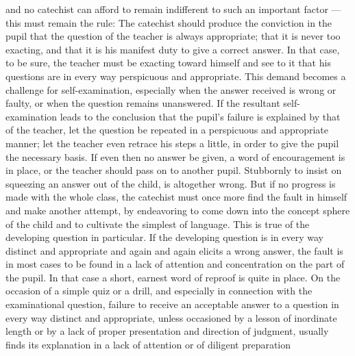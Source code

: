 and no catechist can afford to remain indifferent to such an important factor — this must remain the rule: The catechist should produce the conviction in the pupil that the question of the teacher is always appropriate; that it is never too exacting, and that it is his manifest duty to give a correct answer. In that case, to be sure, the teacher must be exacting toward himself and see to it that his questions are in every way perspicuous and appropriate. This demand becomes a challenge for self-examination, especially when the answer received is wrong or faulty, or when the question remains unanswered. If the resultant self-examination leads to the conclusion that the pupil’s failure is explained by that of the teacher, let the question be repeated in a perspicuous and appropriate manner; let the teacher even retrace his steps a little, in order to give the pupil the necessary basis. If even then no answer be given, a word of encouragement is in place, or the teacher should pass on to another pupil. Stubbornly to insist on squeezing an answer out of the child, is altogether wrong. But if no progress is made with the whole class, the catechist must once more find the fault in himself and make another attempt, by endeavoring to come down into the concept sphere of the child and to cultivate the simplest of language. This is true of the developing question in particular. If the developing question is in every way distinct and appropriate and again and again elicits a wrong answer, the fault is in most cases to be found in a lack of attention and concentration on the part of the pupil. In that case a short, earnest word of reproof is quite in place. On the occasion of a simple quiz or a drill, and especially in connection with the examinational question, failure to receive an acceptable answer to a question in every way distinct and appropriate, unless occasioned by a lesson of inordinate length or by a lack of proper presentation and direction of judgment, usually finds its explanation in a lack of attention or of diligent preparation
